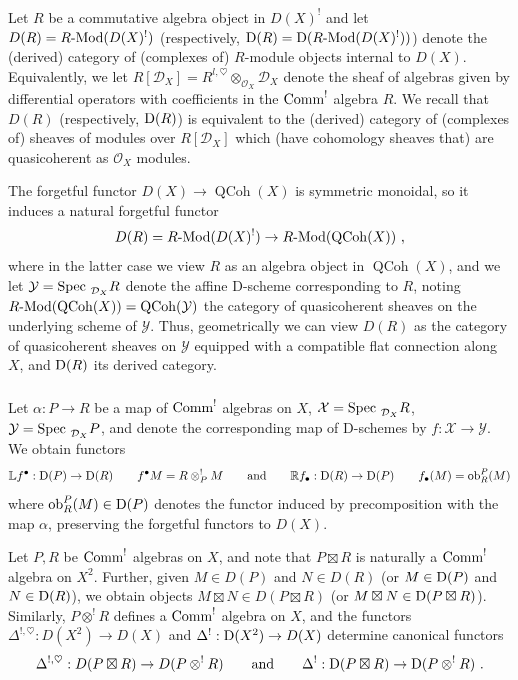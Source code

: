 \documentclass[11pt]{amsart}
\numberwithin{equation}{section}
\theoremstyle{definition}
\newcommand{\bb}{\mathbb}
\newcommand{\mc}{\mathcal}
\newcommand{\ob}{{\textup{ob}}}
\newcommand{\Mod}{{\textup{-Mod}}}
\newcommand{\Spec}{{\textup{Spec\ }}}
\newcommand{\Comm}{{\textup{Comm}}}
\newcommand{\0}{{\textbf{0}}}
\DeclareMathOperator{\QC}{QCoh}
\newcommand{\Dd}{{\textup{D}}}
\newcommand{\DD}{{D}}
\begin{document}
\subsubsection{}
Let $R$ be a commutative algebra object in $\DD(X)^!$ and let $\DD(R)=R\Mod(\DD(X)^!)$ (respectively, $\Dd(R)=\Dd(R\Mod(\DD(X)^!))$) denote the (derived) category of (complexes of) $R$-module objects internal to $\DD(X)$. Equivalently, we let $R[\mc D_X]= R^{l,\heartsuit}\otimes_{\mc O_X} \mc D_X$ denote the sheaf of algebras given by differential operators with coefficients in the $\Comm^!$ algebra $R$. We recall that $\DD(R)$ (respectively, $\Dd(R)$) is equivalent to the (derived) category of (complexes of) sheaves of modules over $R[\mc D_X]$ which (have cohomology sheaves that) are quasicoherent as $\mc O_X$ modules.

The forgetful functor $\DD(X)\to \QC(X)$ is symmetric monoidal, so it induces a natural forgetful functor
\[ \DD(R)=R\Mod(\DD(X)^!) \to R\Mod(\QC(X)) \ , \]
where in the latter case we view $R$ as an algebra object in $\QC(X)$, and we let $\mc Y=\Spec_{\mc D_X}R$ denote the affine D-scheme corresponding to $R$, noting $R\Mod(\QC(X))=\QC(\mc Y)$ the category of quasicoherent sheaves on the underlying scheme of $\mc Y$. Thus, geometrically we can view $\DD(R)$ as the category of quasicoherent sheaves on $\mc Y$ equipped with a compatible flat connection along $X$, and $\Dd(R)$ its derived category.


\subsubsection{} Let $\alpha:P\to R$ be a map of $\Comm^!$ algebras on $X$, $\mc X=\Spec_{\mc D_X} R$, $\mc Y=\Spec_{\mc D_X} P$, and denote the corresponding map of D-schemes by $f:\mc X\to \mc Y$. We obtain functors
\[ \bb L f^\bullet:\Dd(P) \to \Dd(R) \qquad f^\bullet M= R\otimes^!_P M \qquad \text{and}\qquad \bb R f_\bullet:\Dd(R) \to \Dd(P) \qquad f_\bullet(M)=\ob_R^P(M)\]
where $\ob_R^P(M)\in \Dd(P)$ denotes the functor induced by precomposition with the map $\alpha$, preserving the forgetful functors to $\DD(X)$.

Let $P,R$ be $\Comm^!$ algebras on $X$, and note that $P\boxtimes R$ is naturally a $\Comm^!$ algebra on $X^2$. Further, given $M\in \DD(P)$ and $N\in \DD(R)$ (or $M\in \Dd(P)$ and $N\in\Dd(R)$), we obtain objects $ M\boxtimes N \in \DD(P\boxtimes R)$ (or  $ M\boxtimes N \in \Dd(P\boxtimes R)$). Similarly, $P\otimes^! R$ defines a $\Comm^!$ algebra on $X$, and the functors $\Delta^{!,\heartsuit}:\DD(X^2)\to \DD(X)$ and $\Delta^!:\Dd(X^2)\to \DD(X)$ determine canonical functors
\[\Delta^{!,\heartsuit} :\DD(P\boxtimes R) \to \DD(P\otimes^! R) \qquad \text{and} \qquad \Delta^!:\Dd(P\boxtimes R) \to \Dd(P\otimes^! R) \ . \]
\end{document}
